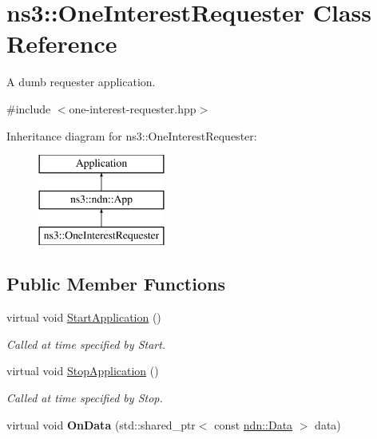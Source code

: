 \hypertarget{classns3_1_1OneInterestRequester}{}\section{ns3\+:\+:One\+Interest\+Requester Class Reference}
\label{classns3_1_1OneInterestRequester}


A dumb requester application.  




{\ttfamily \#include $<$one-\/interest-\/requester.\+hpp$>$}

Inheritance diagram for ns3\+:\+:One\+Interest\+Requester\+:\begin{figure}[H]
\begin{center}
\leavevmode
\includegraphics[height=3.000000cm]{classns3_1_1OneInterestRequester}
\end{center}
\end{figure}
\subsection*{Public Member Functions}
\begin{DoxyCompactItemize}
\item 
virtual void \hyperlink{classns3_1_1OneInterestRequester_a0730154d418e75542822824f848e46c8}{Start\+Application} ()\hypertarget{classns3_1_1OneInterestRequester_a0730154d418e75542822824f848e46c8}{}\label{classns3_1_1OneInterestRequester_a0730154d418e75542822824f848e46c8}

\begin{DoxyCompactList}\small\item\em Called at time specified by Start. \end{DoxyCompactList}\item 
virtual void \hyperlink{classns3_1_1OneInterestRequester_a61d36bc7672c7ccdf072f7b05cefc42f}{Stop\+Application} ()\hypertarget{classns3_1_1OneInterestRequester_a61d36bc7672c7ccdf072f7b05cefc42f}{}\label{classns3_1_1OneInterestRequester_a61d36bc7672c7ccdf072f7b05cefc42f}

\begin{DoxyCompactList}\small\item\em Called at time specified by Stop. \end{DoxyCompactList}\item 
virtual void {\bfseries On\+Data} (std\+::shared\+\_\+ptr$<$ const \hyperlink{classndn_1_1Data}{ndn\+::\+Data} $>$ data)\hypertarget{classns3_1_1OneInterestRequester_a494d106065e4133a9fc5c1cec354e8c3}{}\label{classns3_1_1OneInterestRequester_a494d106065e4133a9fc5c1cec354e8c3}

\end{DoxyCompactItemize}
